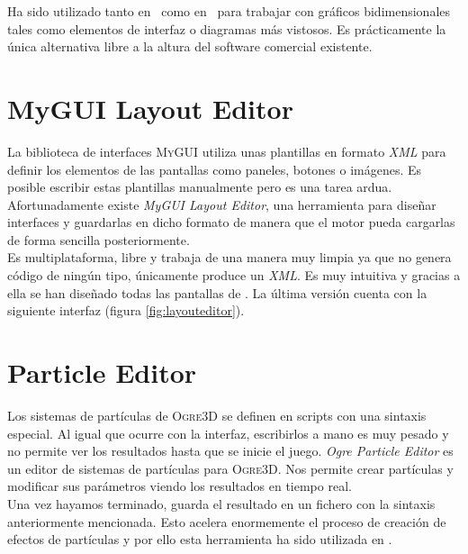 Ha sido utilizado tanto en \wiki\ como en \juego\ para trabajar con gráficos
bidimensionales tales como elementos de interfaz o diagramas más vistosos.
Es prácticamente la única alternativa libre a la altura del software comercial
existente.\\



\section*{MyGUI Layout Editor}

La biblioteca de interfaces \textsc{MyGUI} utiliza unas plantillas en formato
\textit{XML} para definir los elementos de las pantallas como paneles, botones
o imágenes. Es posible escribir estas plantillas manualmente pero es una tarea
ardua. Afortunadamente existe \textit{MyGUI Layout Editor}, una herramienta
para diseñar interfaces y guardarlas en dicho formato de manera que el motor
pueda cargarlas de forma sencilla posteriormente.\\

Es multiplataforma, libre y trabaja de una manera muy limpia ya que no genera
código de ningún tipo, únicamente produce un \textit{XML}. Es muy intuitiva
y gracias a ella se han diseñado todas las pantallas de \juego. La última
versión cuenta con la siguiente interfaz (figura \ref{fig:layouteditor}).\\


\section*{Particle Editor}

Los sistemas de partículas de \textsc{Ogre3D} se definen en scripts con
una sintaxis especial. Al igual que ocurre con la interfaz, escribirlos a mano
es muy pesado y no permite ver los resultados hasta que se inicie el juego.
\textit{Ogre Particle Editor} es un editor de sistemas de partículas para
\textsc{Ogre3D}. Nos permite crear partículas y modificar sus parámetros
viendo los resultados en tiempo real.\\

Una vez hayamos terminado, guarda el resultado en un fichero con la sintaxis
anteriormente mencionada. Esto acelera enormemente el proceso de creación
de efectos de partículas y por ello esta herramienta ha sido utilizada
en \juego.\\


